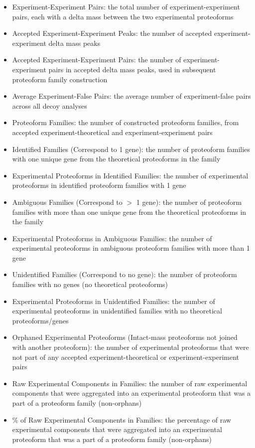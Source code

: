 \begin{itemize}
\begin{itemize}
\item Experiment-Experiment Pairs: the total number of experiment-experiment pairs, each with a delta mass between the two experimental proteoforms
\item Accepted Experiment-Experiment Peaks: the number of accepted experiment-experiment delta mass peaks
\item Accepted Experiment-Experiment Pairs: the number of experiment-experiment pairs in accepted delta mass peaks, used in subsequent proteoform family construction
\item Average Experiment-False Pairs: the average number of experiment-false pairs across all decoy analyses
\item Proteoform Families: the number of constructed proteoform families, from accepted experiment-theoretical and experiment-experiment pairs
\item Identified Families (Correspond to 1 gene): the number of proteoform families with one unique gene from the theoretical proteoforms in the family
\item Experimental Proteoforms in Identified Families: the number of experimental proteoforms in identified proteoform families with 1 gene
\item Ambiguous Families (Correspond to $>$ 1 gene): the number of proteoform families with more than one unique gene from the theoretical proteoforms in the family
\item Experimental Proteoforms in Ambiguous Families: the number of experimental proteoforms in ambiguous proteoform families with more than 1 gene
\item Unidentified Families (Correspond to no gene): the number of proteoform families with no genes (no theoretical proteoforms)
\item Experimental Proteoforms in Unidentified Families: the number of experimental proteoforms in unidentified families with no theoretical proteoforms/genes
\item Orphaned Experimental Proteoforms (Intact-mass proteoforms not joined with another proteoform): the number of experimental proteoforms that were not part of any accepted experiment-theoretical or experiment-experiment pairs
\item Raw Experimental Components in Families: the number of raw experimental components that were aggregated into an experimental proteoform that was a part of a proteoform family (non-orphans)
\item \% of Raw Experimental Components in Families: the percentage of raw experimental components that were aggregated into an experimental proteoform that was a part of a proteoform family (non-orphans)

\end{itemize}
\end{itemize}
